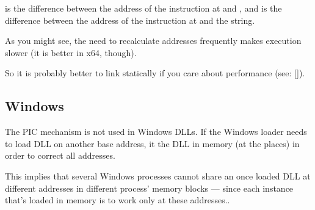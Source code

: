  is the difference between the address of the instruction at  and \globvar{}, and 
 is the difference between the address of the instruction at 
 and the \retstring{} string.

As you might see, the need to recalculate addresses frequently makes execution slower 
(it is better in x64, though).

So it is probably better to link statically if you care about performance (see: [\AgnerFogCPP]).

\subsection{Windows}

The PIC mechanism is not used in Windows DLLs. If the Windows loader needs to load DLL 
on another base address, it  the DLL in memory (at the  places) in order to correct 
all addresses.

This implies that several Windows processes cannot share an once loaded DLL 
at different addresses in different process' memory 
blocks --- since each instance that's loaded in memory is  to work only at these addresses..

